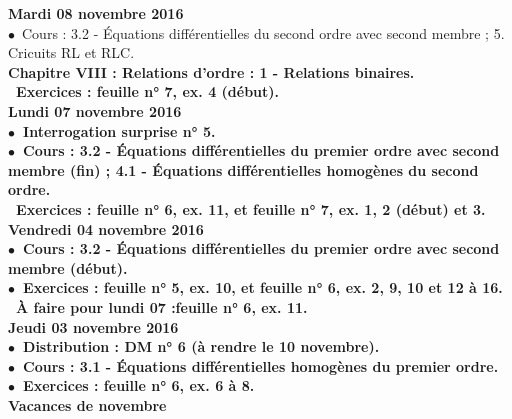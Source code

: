 \documentclass[12pt,a4paper]{article}
\begin{document}
%  


\noindent\textbf{\bf Mardi 08 novembre 2016 }\\
$\bullet$\ Cours : 3.2 - Équations différentielles du second ordre avec second membre ; 5. Cricuits RL et RLC.\\
\bf Chapitre VIII \rm : Relations d'ordre : 1 - Relations binaires.\\
\bu\ Exercices : feuille n° 7, ex. 4 (début).\vspace{.4cm}\\

\noindent\textbf{ Lundi 07 novembre 2016 } \\
$\bullet$\ Interrogation surprise n° 5.\\
$\bullet$\ Cours : 3.2 - Équations différentielles du premier ordre avec second membre (fin) ; 4.1 - Équations 
différentielles homogènes du second ordre.\\
\bu\ Exercices : feuille n° 6, ex. 11, et feuille n° 7, ex. 1, 2 (début) et 3.\vspace{.4cm}\\

\noindent\textbf{Vendredi 04 novembre 2016 }\\
$\bullet$\ Cours : 3.2 - Équations différentielles du premier ordre avec 
second membre (début).\\
$\bullet$\ Exercices : feuille n° 5, ex. 10, et feuille n° 6, ex. 2, 9, 10 et 12 à 16.\\
\bu\ À faire pour lundi 07 :feuille n° 6, ex. 11.\vspace{.4cm}\\

\noindent\textbf{Jeudi 03 novembre 2016 }\\
$\bullet$\ Distribution : DM n° 6 (à rendre le 10 novembre).\\
$\bullet$\ Cours : 3.1 - Équations différentielles homogènes du premier ordre.\\
$\bullet$\ Exercices : feuille n° 6, ex. 6 à 8.\vspace{.4cm}\\

\noindent\textbf{ Vacances de novembre }\vspace{.4cm}\\
\end{document}
